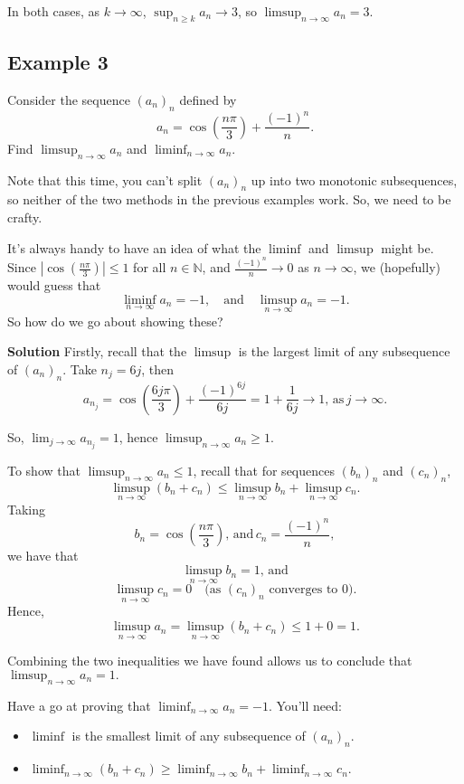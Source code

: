 \documentclass[
  12pt,
  a4paper]{extarticle}
\providecommand{\tightlist}{%
  \setlength{\itemsep}{0pt}\setlength{\parskip}{0pt}}
\theoremstyle{plain}
\theoremstyle{definition}
\theoremstyle{plain}
\theoremstyle{plain}
\theoremstyle{plain}
\theoremstyle{plain}
\theoremstyle{definition}
\theoremstyle{definition}
\theoremstyle{remark}
\theoremstyle{remark}
\let\BeginKnitrBlock\begin \let\EndKnitrBlock\end
\renewcommand{\;}{\,}
\begin{document}
In both cases, as \(k \to \infty\), \(\sup_{n\geq k }a_n \to 3\), so \(\limsup_{n \to \infty} a_n = 3\).

\hypertarget{example-3}{%
\subsection*{Example 3}\label{example-3}}

\BeginKnitrBlock{example}
{\label{exm:ex3} }Consider the sequence \((a_n)_{n}\) defined by \[a_n = \cos\left(\frac{n\pi}{3}\right) + \frac{(-1)^n}{n}.\] Find \(\limsup_{n \to \infty} a_n\) and \(\liminf_{n \to \infty} a_n\).
\EndKnitrBlock{example}
Note that this time, you can't split \((a_n)_n\) up into two monotonic subsequences, so neither of the two methods in the previous examples work. So, we need to be crafty.

It's always handy to have an idea of what the \(\liminf\) and \(\limsup\) might be. Since \(\left\lvert\cos\left(\frac{n\pi}{3}\right)\right\rvert \leq 1\) for all \(n \in \mathbb{N}\), and \(\frac{(-1)^n}{n} \to 0\) as \(n \to \infty\), we (hopefully) would guess that \[\liminf_{n\to\infty}a_n = -1, \quad \text{and} \quad \limsup_{n \to \infty} a_n = -1.\] So how do we go about showing these?

\textbf{Solution}
Firstly, recall that the \(\limsup\) is the largest limit of any subsequence of \((a_n)_n\). Take \(n_j = 6j\), then \[a_{n_j} = \cos\left(\frac{6j\pi}{3}\right) + \frac{(-1)^{6j}}{6j} = 1 + \frac{1}{6j} \to 1, \; \text{as} \; j \to \infty.\]

So, \(\lim_{j \to \infty} a_{n_j} = 1\), hence \(\limsup_{n \to \infty} a_n \geq 1\).

To show that \(\limsup_{n \to \infty} a_n \leq 1\), recall that for sequences \((b_n)_n\) and \((c_n)_n\), \[\limsup_{n \to \infty}(b_n + c_n) \leq \limsup_{n \to \infty}b_n + \limsup_{n \to \infty}c_n.\] Taking \[b_n = \cos\left(\frac{n\pi}{3}\right), \; \text{and} \; c_n = \frac{(-1)^n}{n},\] we have that \[\limsup_{n \to \infty} b_n = 1, \; \text{and}\] \[\limsup_{n \to \infty} c_n = 0 \quad \text{(as $(c_n)_n$ converges to $0$)}.\] Hence,
\[\limsup_{n \to \infty} a_n = \limsup_{n \to \infty}(b_n + c_n) \leq 1 + 0 = 1.\]

Combining the two inequalities we have found allows us to conclude that \(\limsup_{n \to \infty} a_n = 1.\)

Have a go at proving that \(\liminf_{n \to \infty} a_n = -1\). You'll need:

\begin{itemize}
\tightlist
\item
  \(\liminf\) is the smallest limit of any subsequence of \((a_n)_n\).
\item
  \(\liminf_{n \to \infty}(b_n + c_n) \geq \liminf_{n \to \infty}b_n + \liminf_{n \to \infty}c_n.\)
\end{itemize}
\end{document}

